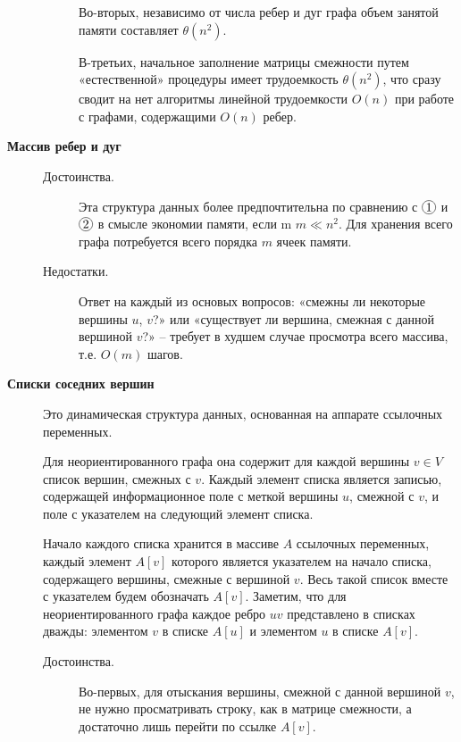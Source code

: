 \begin{note}
\begin{description}
\begin{description}
                        Во-вторых, независимо от числа ребер и дуг графа объем занятой памяти составляет $ \theta(n^2) $.

                        В-третьих, начальное заполнение матрицы смежности путем «естественной» процедуры имеет трудоемкость $ \theta(n^2) $, что сразу сводит на нет алгоритмы линейной трудоемкости $ O(n) $ при работе с графами, содержащими $ O(n) $ ребер.
              \end{description}

        \item[\circled{3} \textbf{Массив ребер и дуг}]\leavevmode
              \begin{description}
                  \item[Достоинства.] Эта структура данных более предпочтительна по сравнению с $\circled{1}$ и $\circled{2}$ в смысле экономии памяти, если m $m \ll n^2 $. Для хранения всего графа потребуется всего порядка $ m $ ячеек памяти.
                  \item[Недостатки.] Ответ на каждый из основых вопросов: «смежны ли некоторые вершины $ u $, $ v $?» или «существует ли вершина, смежная с данной вершиной $ v $?» – требует в худшем случае просмотра всего массива, т.е. $ O(m) $ шагов.
              \end{description}

        \item[\circled{4} \textbf{Списки соседних вершин}]
              Это динамическая структура данных, основанная на аппарате ссылочных переменных.

              Для неориентированного графа она содержит для каждой вершины $ v \in V $ список вершин, смежных с $ v $. Каждый элемент списка является записью, содержащей информационное поле с меткой вершины $ u $, смежной с $ v $, и поле с указателем на следующий элемент списка.

              Начало каждого списка хранится в массиве $ A $ ссылочных переменных, каждый элемент $ A[v] $ которого является указателем на начало списка, содержащего вершины, смежные с вершиной $ v $. Весь такой список вместе с указателем будем обозначать $ A[v] $.
              Заметим, что для неориентированного графа каждое ребро $ uv $ представлено в списках дважды: элементом $ v $ в списке $ A[u] $ и элементом $ u $ в списке $ A[v] $.
              \begin{description}
                  \item[Достоинства.]
                        Во-первых, для отыскания вершины, смежной с данной вершиной $ v $, не нужно просматривать строку, как в матрице смежности, а достаточно лишь перейти по ссылке $ A[v] $.


\end{description}
\end{description}
\end{note}
